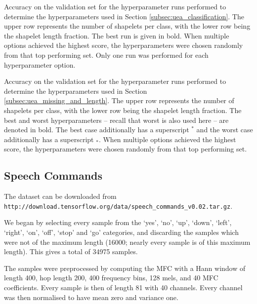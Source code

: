 \documentclass{article}
\theoremstyle{plain}
\theoremstyle{definition}
\begin{document}
	\begin{table}
		\centering
		
		\caption{Accuracy on the validation set for the hyperparameter runs performed to determine the hyperparameters used in Section \ref{subsec:uea_classification}. The upper row represents the number of shapelets per class, with the lower row being the shapelet length fraction. The best run is given in bold. When multiple options achieved the highest score, the hyperparameters were chosen randomly from that top performing set. Only one run was performed for each hyperparameter option.}\label{tab:uea_hyperparams_old_results}

		\bigskip\bigskip  %

		\centering
		
		\caption{Accuracy on the validation set for the hyperparameter runs performed to determine the hyperparameters used in Section \ref{subsec:uea_missing_and_length}. The upper row represents the number of shapelets per class, with the lower row being the shapelet length fraction. The best and worst hyperparameters -- recall that worst is also used here -- are denoted in bold. The best case additionally has a superscript $^*$ and the worst case additionally has a superscript $_*$. When multiple options achieved the highest score, the hyperparameters were chosen randomly from that top performing set.}\label{tab:uea_hyperparams_l2_results}
	\end{table}


	\subsection{Speech Commands}\label{apx:further_speech_commands_interpretability}
	The dataset can be downloaded from\\ \texttt{http://download.tensorflow.org/data/speech\_commands\_v0.02.tar.gz}.
	
	We began by selecting every sample from the `yes', `no', `up', `down', `left', `right', `on', `off', `stop' and `go' categories, and discarding the samples which were not of the maximum length (16000; nearly every sample is of this maximum length). This gives a total of 34975 samples.
	
	The samples were preprocessed by computing the MFC with a Hann window of length 400, hop length 200, 400 frequency bins, 128 mels, and 40 MFC coefficients. Every sample is then of length 81 with 40 channels. Every channel was then normalised to have mean zero and variance one.
	
\end{document}
